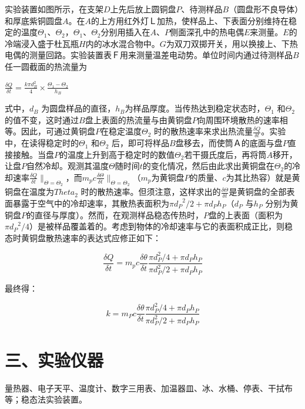 \documentclass[11pt,a4paper,oneside]{article}
\begin{document}
实验装置如图所示，在支架$D$上先后放上圆铜盘$P$、待测样品$B$（圆盘形不良导体）和厚底紫铜圆盘$A$。在$A$的上方用红外灯Ｌ加热，使样品上、下表面分别维持在稳定的温度$\Theta _1$、$\Theta _2$，$\Theta _1$、$\Theta _2$分别用插入在$A$、$P$侧面深孔中的热电偶$E$来测量。$E$的冷端浸入盛于杜瓦瓶$H$内的冰水混合物中。$G$为双刀双掷开关，用以换接上、下热电偶的测量回路。实验装置表Ｆ用来测量温差电动势。单位时间内通过待测样品$B$任一圆截面的热流量为
\begin{center}
$\displaystyle\frac{\delta Q}{\delta t}= \displaystyle\frac{k\pi d_{B}^{2}}{4} {\times} \displaystyle\frac{\Theta _1-\Theta _2}{h_B}$
\end{center}
式中，$d_{B}$ 为圆盘样品的直径，$h_{B}$为样品厚度。当传热达到稳定状态时，$\Theta _1$ 和$\Theta _2$ 的值不变，这时通过$B$盘上表面的热流量与由黄铜盘$P$向周围环境散热的速率相等。因此，可通过黄铜盘$P$在稳定温度$\Theta _2$ 时的散热速率来求出热流量$\displaystyle\frac{\delta Q}{\delta t}$。实验中，在读得稳定时的$\Theta _1$ 和$\Theta _2$ 后，即可将样品$B$盘移去，而使筒Ａ的底面与盘$P$直接接触。当盘$P$的温度上升到高于稳定时的数值$\Theta _2$若干摄氏度后，再将筒$A$移开，让盘$P$自然冷却。观测其温度$\Theta $随时间$t$的变化情况，然后由此求出黄铜盘在$\Theta _2$的冷却速率$\displaystyle\frac{\delta Q}{\delta t}\|_{\Theta =\Theta _2}$，而$m_pc\displaystyle\frac{\delta \Theta }{\delta t}\|_{\Theta =\Theta _2}$（$m_p$为黄铜盘$P$的质量、$c$为其比热容）就是黄铜盘在温度为$Theta _2$ 时的散热速率。但须注意，这样求出的$\displaystyle\frac{\delta \Theta }{\delta t}$是黄铜盘的全部表面暴露于空气中的冷却速率，其散热表面积为$\pi {d_{P}}^{2}/2+\pi d_{P}h_{P}$（$d_P$ 与$h_P$ 分别为黄铜盘$P$的直径与厚度）。然而，在观测样品稳态传热时，$P$盘的上表面（面积为$\pi {d_{P}}^{2}/4$）是被样品覆盖着的。考虑到物体的冷却速率与它的表面积成正比，则稳态时黄铜盘散热速率的表达式应修正如下：

$$\displaystyle\frac{{\delta}Q}{{\delta}t} ={m_p}c{\displaystyle\frac{{\delta}{\theta}}{{\delta}t}}{\displaystyle\frac{{\pi}{d^2_P/4}+{\pi}{d_P}{h_P}}{{\pi}{d^2_P/2}+{\pi}{d_P}{h_P}}}$$

最终得：

$$k = {m_P}c{\displaystyle\frac{{\delta}{\theta}}{{\delta}t}}{\displaystyle\frac{{\pi}{d^2_P}/4+{\pi}{d_P}{h_P}}{{\pi}{d^2_P}/2+{\pi}{d_P}{h_P}}}$$

\section*{三、实验仪器}
量热器、电子天平、温度计、数字三用表、加温器皿、冰、水桶、停表、干拭布等；稳态法实验装置。
\end{document}
